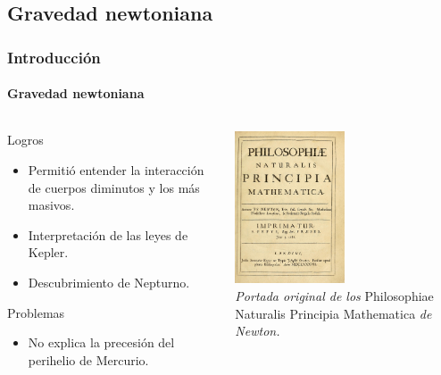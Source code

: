 \documentclass{beamer}
\begin{document}
\subsection{Gravedad newtoniana}
\begin{frame}
\frametitle{Introducción}
\framesubtitle{Gravedad newtoniana}
\begin{columns}[c]
  \begin{column}[c]{.5\textwidth}
  \begin{exampleblock}{Logros}
    \begin{itemize}
      \item Permitió entender la interacción de cuerpos diminutos y los más masivos.
      \item Interpretación de las leyes de Kepler.
      \item Descubrimiento de Nepturno.
    \end{itemize}
  \end{exampleblock}
  \begin{alertblock}{Problemas}
  \begin{itemize}
    \item No explica la precesión del perihelio de Mercurio.
  \end{itemize}
  \end{alertblock}
  \end{column}
  \begin{column}[c]{.5\textwidth}
    \centering
    \includegraphics[height=4.5cm]{newton} \\
    {\small{\textit{Portada original de los} Philosophiae Naturalis Principia Mathematica\textit{ de Newton.}}}
  \end{column}
\end{columns}
\end{frame}
\end{document}
